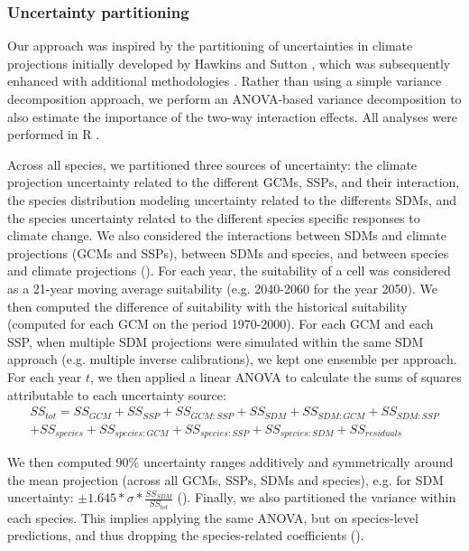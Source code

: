 \subsubsection{Uncertainty partitioning}

Our approach was inspired by the partitioning of uncertainties in climate projections initially developed by Hawkins and Sutton \citep{Hawkins2009, Hawkins2011}, which was subsequently enhanced with additional methodologies \citep[e.g.][]{Yip2011, Lafferty2023}. 
Rather than using a simple variance decomposition approach, we perform an ANOVA-based variance decomposition to also estimate the importance of the two-way interaction effects. All analyses were performed in R \citep{RCT2024}.

Across all species, we partitioned three sources of uncertainty: the climate projection uncertainty related to the different GCMs, SSPs, and their interaction, the species distribution modeling uncertainty related to the differents SDMs, and the species uncertainty related to the different species specific responses to climate change. We also considered the interactions between SDMs and climate projections (GCMs and SSPs), between SDMs and species, and between species and climate projections (). For each year, the suitability of a cell was considered as a 21-year moving average suitability (e.g. 2040-2060 for the year 2050). We then computed the difference of suitability with the historical suitability (computed for each GCM on the period 1970-2000). For each GCM and each SSP, when multiple SDM projections were simulated within the same SDM approach (e.g. multiple inverse calibrations), we kept one ensemble per approach. For each year $t$, we then applied a linear ANOVA to calculate the sums of squares attributable to each uncertainty source:
\begin{multline*}
{SS}_{tot} = {SS}_{GCM} + {SS}_{SSP} + {SS}_{GCM:SSP} + {SS}_{SDM} + {SS}_{SDM:GCM} + {SS}_{SDM:SSP}\\+ {SS}_{species} + {SS}_{species:GCM} + {SS}_{species:SSP} + {SS}_{species:SDM} + {SS}_{residuals}
\end{multline*}

We then computed 90\% uncertainty ranges additively and symmetrically around the mean projection (across all GCMs, SSPs, SDMs and species), e.g. for SDM uncertainty: $\pm1.645*\sigma*\frac{{SS}_{SDM}}{{SS}_{tot}}$ ().
Finally, we also partitioned the variance within each species. This implies applying the same ANOVA, but on species-level predictions, and thus dropping the species-related coefficients ().

